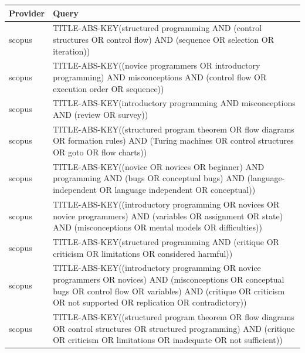 \documentclass{article}
\begin{document}
\begin{longtable}{lp{10cm}}
\toprule
Provider & Query \\
\midrule
scopus & TITLE-ABS-KEY(\textquotedbl{}structured programming\textquotedbl{} AND (\textquotedbl{}control structures\textquotedbl{} OR \textquotedbl{}control flow\textquotedbl{}) AND (sequence OR selection OR iteration)) \\
scopus & TITLE-ABS-KEY((\textquotedbl{}novice programmers\textquotedbl{} OR \textquotedbl{}introductory programming\textquotedbl{}) AND misconceptions AND (\textquotedbl{}control flow\textquotedbl{} OR \textquotedbl{}execution order\textquotedbl{} OR sequence)) \\
scopus & TITLE-ABS-KEY(\textquotedbl{}introductory programming\textquotedbl{} AND misconceptions AND (review OR survey)) \\
scopus & TITLE-ABS-KEY((\textquotedbl{}structured program theorem\textquotedbl{} OR \textquotedbl{}flow diagrams\textquotedbl{} OR \textquotedbl{}formation rules\textquotedbl{}) AND (\textquotedbl{}Turing machines\textquotedbl{} OR \textquotedbl{}control structures\textquotedbl{} OR goto OR \textquotedbl{}flow charts\textquotedbl{})) \\
scopus & TITLE-ABS-KEY((novice OR novices OR beginner) AND programming AND (bugs OR \textquotedbl{}conceptual bugs\textquotedbl{}) AND (\textquotedbl{}language-independent\textquotedbl{} OR \textquotedbl{}language independent\textquotedbl{} OR conceptual)) \\
scopus & TITLE-ABS-KEY((\textquotedbl{}introductory programming\textquotedbl{} OR novices OR \textquotedbl{}novice programmers\textquotedbl{}) AND (variables OR assignment OR state) AND (misconceptions OR \textquotedbl{}mental models\textquotedbl{} OR difficulties)) \\
scopus & TITLE-ABS-KEY(\textquotedbl{}structured programming\textquotedbl{} AND (critique OR criticism OR limitations OR \textquotedbl{}considered harmful\textquotedbl{})) \\
scopus & TITLE-ABS-KEY((\textquotedbl{}introductory programming\textquotedbl{} OR \textquotedbl{}novice programmers\textquotedbl{} OR novices) AND (misconceptions OR \textquotedbl{}conceptual bugs\textquotedbl{} OR \textquotedbl{}control flow\textquotedbl{} OR variables) AND (critique OR criticism OR \textquotedbl{}not supported\textquotedbl{} OR replication OR contradictory)) \\
scopus & TITLE-ABS-KEY((\textquotedbl{}structured program theorem\textquotedbl{} OR \textquotedbl{}flow diagrams\textquotedbl{} OR \textquotedbl{}control structures\textquotedbl{} OR \textquotedbl{}structured programming\textquotedbl{}) AND (critique OR criticism OR limitations OR inadequate OR \textquotedbl{}not sufficient\textquotedbl{})) \\

\end{longtable}
\end{document}
